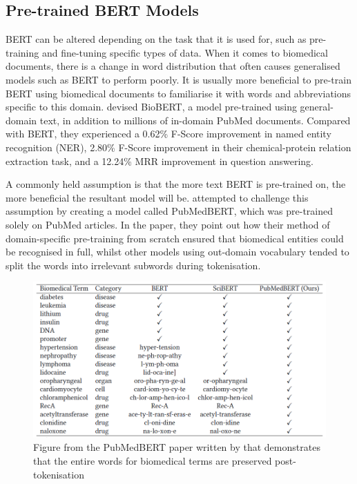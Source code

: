 \documentclass{l4proj}
\begin{document}
\subsection{Pre-trained BERT Models}
BERT can be altered depending on the task that it is used for, such as pre-training and fine-tuning specific types of data. When it comes to biomedical documents, there is a change in word distribution that often causes generalised models such as BERT to perform poorly. It is usually more beneficial to pre-train BERT using biomedical documents to familiarise it with words and abbreviations specific to this domain. \cite{BioBERT} devised BioBERT, a model pre-trained using general-domain text, in addition to millions of in-domain PubMed documents. Compared with BERT, they experienced a 0.62\% F-Score improvement in named entity recognition (NER), 2.80\% F-Score improvement in their chemical-protein relation extraction task, and a 12.24\% MRR improvement in question answering.

A commonly held assumption is that the more text BERT is pre-trained on, the more beneficial the resultant model will be. \cite{PubMedBERT} attempted to challenge this assumption by creating a model called PubMedBERT, which was pre-trained solely on PubMed articles. In the paper, they point out how their method of domain-specific pre-training from scratch ensured that biomedical entities could be recognised in full, whilst other models using out-domain vocabulary tended to split the words into irrelevant subwords during tokenisation. 

\begin{figure}[hbt!]
    \centering
    \includegraphics[width=14cm]{images/PubMedBERT.png}
  \caption{Figure from the PubMedBERT paper written by \cite{PubMedBERT} that demonstrates that the entire words for biomedical terms are preserved post-tokenisation}
  \label{fig:BERTvsGPT}
\end{figure}
\end{document}
